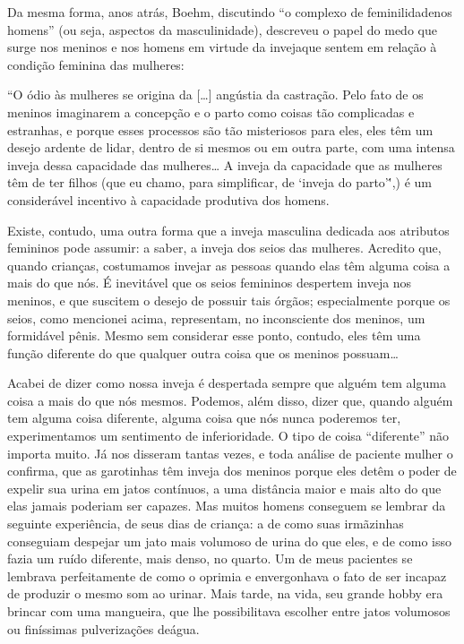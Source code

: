 Da mesma forma, anos atrás, Boehm,\idxboehm{} discutindo ``o
complexo de feminilidade\idxcompl[|(] nos homens'' (ou seja, aspectos
da masculinidade), descreveu o papel do medo que surge nos meninos e
nos homens em virtude da inveja\idxfemininve[|(] que sentem em relação à condição
feminina das mulheres:

``O ódio às mulheres se origina da [\ldots{}] angústia da
castração.\idxcasta{} Pelo fato de os meninos imaginarem a concepção e o parto
como coisas tão complicadas e estranhas, e porque esses processos são
tão misteriosos para eles, eles têm um desejo ardente de lidar, dentro
de si mesmos ou em outra parte, com uma intensa inveja dessa capacidade
das mulheres\ldots{} A inveja da capacidade que as mulheres têm de ter
filhos (que eu chamo, para simplificar, de `inveja do
parto'\'',) é um considerável incentivo à capacidade
produtiva dos homens.

Existe, contudo, uma outra forma que a inveja masculina dedicada aos
atributos femininos pode assumir: a saber, a inveja dos seios\idxseios{} das
mulheres. Acredito que, quando crianças, costumamos invejar as
pessoas quando elas têm alguma coisa a mais do que nós. É inevitável
que os seios femininos despertem inveja nos meninos, e que suscitem o
desejo de possuir tais órgãos; especialmente porque os seios, como
mencionei acima, representam, no inconsciente dos meninos, um
formidável pênis. Mesmo sem considerar esse ponto, contudo, eles têm
uma função diferente do que qualquer outra coisa que os meninos
possuam\ldots{}

Acabei de dizer como nossa inveja é despertada sempre que alguém tem
alguma coisa a mais do que nós mesmos. Podemos, além disso, dizer que,
quando alguém tem alguma coisa diferente, alguma coisa que nós nunca
poderemos ter, experimentamos um sentimento de inferioridade. O tipo
de coisa ``diferente'' não importa muito. Já
nos disseram tantas vezes, e toda análise de paciente mulher o
confirma, que as garotinhas têm inveja\idxinvej{} dos meninos porque eles detêm o
poder de expelir sua urina em jatos contínuos, a uma distância maior e
mais alto do que elas jamais poderiam ser capazes. Mas muitos homens
conseguem se lembrar da seguinte experiência, de seus dias de criança:
a de como suas irmãzinhas conseguiam despejar um jato mais volumoso de
urina do que eles, e de como isso fazia um ruído diferente, mais denso,
no quarto. Um de meus pacientes se lembrava perfeitamente de como o
oprimia e envergonhava o fato de ser incapaz de produzir o mesmo som ao
urinar. Mais tarde, na vida, seu grande hobby era brincar com uma
mangueira, que lhe possibilitava escolher entre jatos volumosos ou
finíssimas pulverizações de\idxfemininve[|)] água.

